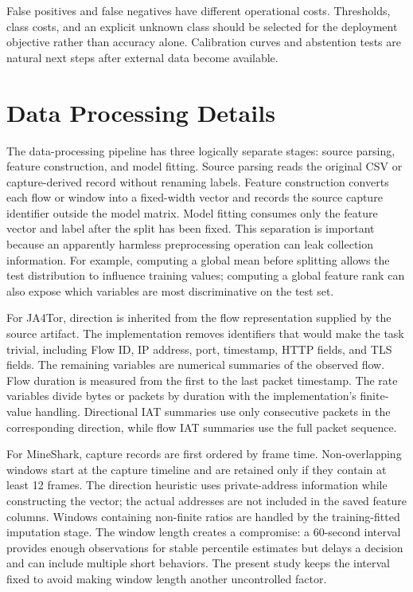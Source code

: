 \documentclass[conference]{IEEEtran}
\begin{document}
False positives and false negatives have different operational costs. Thresholds, class costs, and an explicit unknown class should be selected for the deployment objective rather than accuracy alone. Calibration curves and abstention tests are natural next steps after external data become available.

\section{Data Processing Details}
The data-processing pipeline has three logically separate stages: source parsing, feature construction, and model fitting. Source parsing reads the original CSV or capture-derived record without renaming labels. Feature construction converts each flow or window into a fixed-width vector and records the source capture identifier outside the model matrix. Model fitting consumes only the feature vector and label after the split has been fixed. This separation is important because an apparently harmless preprocessing operation can leak collection information. For example, computing a global mean before splitting allows the test distribution to influence training values; computing a global feature rank can also expose which variables are most discriminative on the test set.

For JA4Tor, direction is inherited from the flow representation supplied by the source artifact. The implementation removes identifiers that would make the task trivial, including Flow ID, IP address, port, timestamp, HTTP fields, and TLS fields. The remaining variables are numerical summaries of the observed flow. Flow duration is measured from the first to the last packet timestamp. The rate variables divide bytes or packets by duration with the implementation's finite-value handling. Directional IAT summaries use only consecutive packets in the corresponding direction, while flow IAT summaries use the full packet sequence.

For MineShark, capture records are first ordered by frame time. Non-overlapping windows start at the capture timeline and are retained only if they contain at least 12 frames. The direction heuristic uses private-address information while constructing the vector; the actual addresses are not included in the saved feature columns. Windows containing non-finite ratios are handled by the training-fitted imputation stage. The window length creates a compromise: a 60-second interval provides enough observations for stable percentile estimates but delays a decision and can include multiple short behaviors. The present study keeps the interval fixed to avoid making window length another uncontrolled factor.
\end{document}

